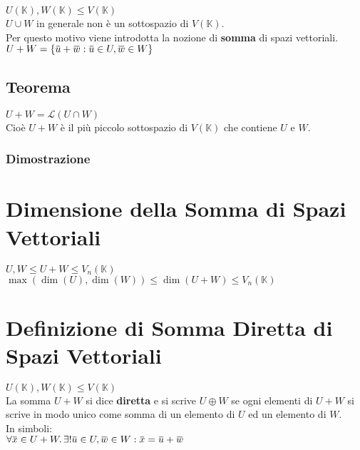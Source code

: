 \documentclass[a4paper, twoside, italian, 11pt]{book}
\newcommand{\braces}[1] {\left \{ #1 \right \}}
\newcommand{\overbar}[1] {\mkern 1.5mu\overline{\mkern-1.5mu#1\mkern-1.5mu}\mkern 1.5mu}
\newcommand{\K}{\mathbb K}
\newcommand{\LS}{\mathcal L}
\begin{document}
$U(\K), W(\K) \leq V(\K)$ \\

\noindent
$U \cup W$ in generale non è un sottospazio di $V(\K)$. \\
Per questo motivo viene introdotta la nozione di \textbf{somma} di spazi vettoriali. \\

\noindent
$U + W = \braces{\overbar u + \overbar w : \overbar u \in U, \overbar w \in W}$


\subsection{Teorema}

$U + W  = \LS (U \cap W)$ \\

\noindent
Cioè $U + W$ è il più piccolo sottospazio di $V(\K)$ che contiene $U$ e $W$.


\subsubsection{Dimostrazione}




\section{Dimensione della Somma di Spazi Vettoriali}

$U, W \leq U + W \leq V_n(\K)$ \\

\noindent
$\max(\dim(U), \dim(W)) \leq \dim(U + W) \leq V_n(\K)$



\section{Definizione di Somma Diretta di Spazi Vettoriali}

$U(\K), W(\K) \leq V(\K)$ \\

\noindent
La somma $U + W$ si dice \textbf{diretta} e si scrive $U \oplus W$ se ogni elementi di $U + W$ si scrive in modo unico come somma di un elemento di $U$ ed un elemento di $W$. \\

\noindent
In simboli: \\

$\forall \overbar x \in U + W \ldotp \exists! \overbar u \in U, \overbar w \in W : \overbar x = \overbar u + \overbar w$
\end{document}
